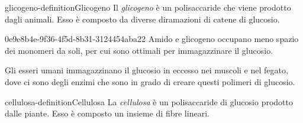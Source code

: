 \documentclass[preview]{standalone}
\begin{document}
\begin{snippetdefinition}{glicogeno-definition}{Glicogeno}
    Il \textit{glicogeno} è un polisaccaride che viene prodotto dagli animali.
    Esso è composto da diverse diramazioni di catene di glucosio.
\end{snippetdefinition}

\begin{snippet}{0e9e8b4e-9f36-4f5d-8b31-3124454aba22}
    Amido e glicogeno occupano meno spazio dei monomeri da soli, per cui sono ottimali per immagazzinare
il glucosio.

Gli esseri umani immagazzinano il glucosio in eccesso nei muscoli e nel fegato, dove ci sono degli enzimi
che sono in grado di creare questi polimeri di glucosio.
\end{snippet}

\begin{snippetdefinition}{cellulosa-definition}{Cellulosa}
    La \textit{cellulosa} è un polisaccaride di glucosio prodotto dalle piante.
    Esso è composto un insieme di fibre lineari.
\end{snippetdefinition}



\end{document}
